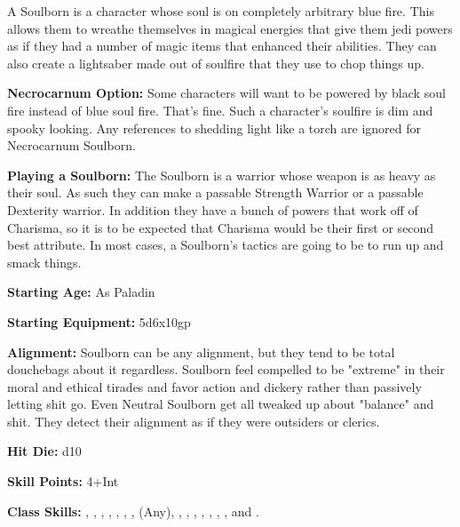 
A Soulborn is a character whose soul is on completely arbitrary blue fire. This allows them to wreathe themselves in magical energies that give them jedi powers as if they had a number of magic items that enhanced their abilities. They can also create a lightsaber made out of soulfire that they use to chop things up. 

\textbf{Necrocarnum Option:} Some characters will want to be powered by black soul fire instead of blue soul fire. That's fine. Such a character's soulfire is dim and spooky looking. Any references to shedding light like a torch are ignored for Necrocarnum Soulborn. 

\textbf{Playing a Soulborn:} The Soulborn is a warrior whose weapon is as heavy as their soul. As such they can make a passable Strength Warrior or a passable Dexterity warrior. In addition they have a bunch of powers that work off of Charisma, so it is to be expected that Charisma would be their first or second best attribute. In most cases, a Soulborn's tactics are going to be to run up and smack things. 

\textbf{Starting Age:} As Paladin 

\textbf{Starting Equipment:} 5d6x10gp 

\textbf{Alignment:} Soulborn can be any alignment, but they tend to be total douchebags about it regardless. Soulborn feel compelled to be "extreme" in their moral and ethical tirades and favor action and dickery rather than passively letting shit go. Even Neutral Soulborn get all tweaked up about "balance" and shit. They detect their alignment as if they were outsiders or clerics. 

\textbf{Hit Die:} d10 

\goodbab{}

\goodfor{}
\poorref{}
\goodwil{}

\textbf{Skill Points:} 4+Int 

\textbf{Class Skills:} , , , , , , ,  (Any), , , , , , , , and .

